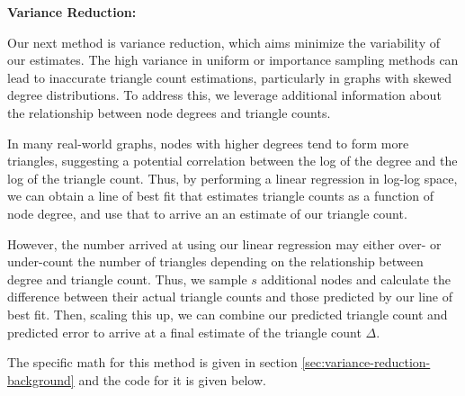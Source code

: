 \documentclass[11pt]{article}
\begin{document}
\textbf{Variance Reduction:}
\label{variance-reduction-algo}

Our next method is variance reduction, which aims minimize the variability of our estimates.
The high variance in uniform or importance sampling methods can lead to inaccurate triangle count estimations, particularly in graphs with skewed degree distributions.
To address this, we leverage additional information about the relationship between node degrees and triangle counts.

In many real-world graphs, nodes with higher degrees tend to form more triangles, suggesting a potential correlation between the log of the degree and the log of the triangle count.
Thus, by performing a linear regression in log-log space, we can obtain a line of best fit that estimates triangle counts as a function of node degree, and use that to arrive an an estimate of our triangle count.

However, the number arrived at using our linear regression may either over- or under-count the number of triangles depending on the relationship between degree and triangle count.
Thus, we sample $s$ additional nodes and calculate the difference between their actual triangle counts and those predicted by our line of best fit.
Then, scaling this up, we can combine our predicted triangle count and predicted error to arrive at a final estimate of the triangle count $\Delta$.

The specific math for this method is given in section \ref{sec:variance-reduction-background} and the code for it is given below.
\end{document}
